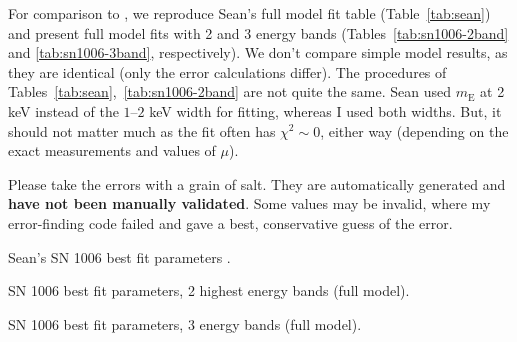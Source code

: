 \documentclass[iop, apj, numberedappendix, twocolappendix]{emulateapj}
\newcommand*{\mt}{\mathrm}
\newcommand*{\mE}{m_\mt{E}}
\begin{document}
For comparison to , we reproduce Sean's full model fit
table (Table~\ref{tab:sean}) and present full model fits with 2 and 3 energy
bands (Tables~\ref{tab:sn1006-2band} and \ref{tab:sn1006-3band}, respectively).
We don't compare simple model results, as they are identical (only the error
calculations differ).
The procedures of Tables~\ref{tab:sean},~\ref{tab:sn1006-2band} are not quite
the same.  Sean used $\mE$ at 2 keV instead of the $1$--$2$ keV width for
fitting, whereas I used both widths.  But, it should not matter much as
the fit often has $\chi^2 \sim 0$, either way (depending on the exact
measurements and values of $\mu$).

Please take the errors with a grain of salt.  They are automatically
generated and \textbf{have not been manually validated}.  Some values may be
invalid, where my error-finding code failed and gave a best, conservative guess
of the error.

\begin{table}[ht]
    \tiny
    \centering
    \caption{Sean's SN 1006 best fit parameters .
    \label{tab:sean}}
    
\end{table}

\begin{table*}[ht]
    \scriptsize
    \centering
    \caption{SN 1006 best fit parameters, 2 highest energy bands (full model).
    \label{tab:sn1006-2band}}
    
\end{table*}

\begin{table*}[ht]
    \scriptsize
    \centering
    \caption{SN 1006 best fit parameters, 3 energy bands (full model).
    \label{tab:sn1006-3band}}
    
\end{table*}


\end{document}
